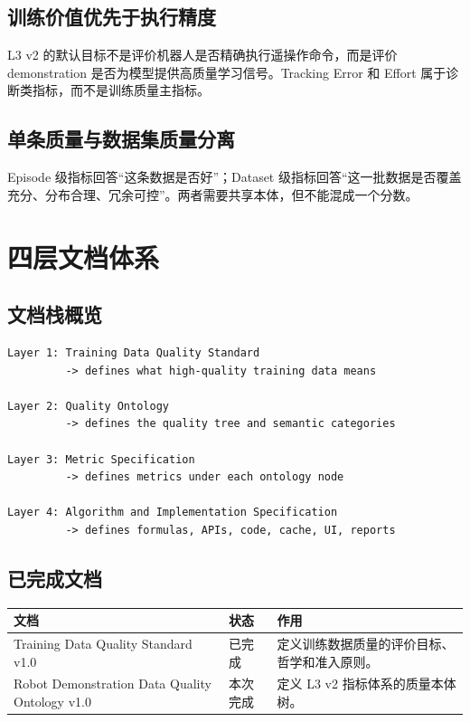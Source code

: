 \documentclass[UTF8,zihao=-4]{ctexart}
\begin{document}
\subsection{训练价值优先于执行精度}

L3 v2 的默认目标不是评价机器人是否精确执行遥操作命令，而是评价 demonstration 是否为模型提供高质量学习信号。Tracking Error 和 Effort 属于诊断类指标，而不是训练质量主指标。

\subsection{单条质量与数据集质量分离}

Episode 级指标回答“这条数据是否好”；Dataset 级指标回答“这一批数据是否覆盖充分、分布合理、冗余可控”。两者需要共享本体，但不能混成一个分数。

\section{四层文档体系}

\subsection{文档栈概览}

\begin{verbatim}
Layer 1: Training Data Quality Standard
         -> defines what high-quality training data means

Layer 2: Quality Ontology
         -> defines the quality tree and semantic categories

Layer 3: Metric Specification
         -> defines metrics under each ontology node

Layer 4: Algorithm and Implementation Specification
         -> defines formulas, APIs, code, cache, UI, reports
\end{verbatim}

\subsection{已完成文档}

\begin{longtable}{L{4cm} L{4cm} L{6cm}}
\toprule
文档 & 状态 & 作用 \\
\midrule
Training Data Quality Standard v1.0 & 已完成 & 定义训练数据质量的评价目标、哲学和准入原则。 \\
Robot Demonstration Data Quality Ontology v1.0 & 本次完成 & 定义 L3 v2 指标体系的质量本体树。 \\
\bottomrule
\end{longtable}
\end{document}
